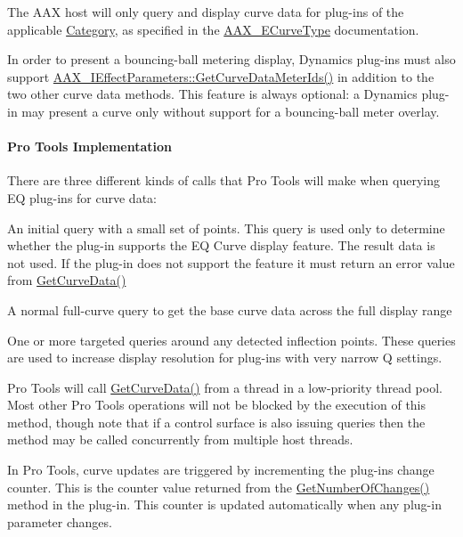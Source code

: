  The A\+A\+X host will only query and display curve data for plug-\/ins of the applicable \hyperlink{a00206_aef9637518fb1ac0e2f403444c73aba4a}{Category}, as specified in the \hyperlink{a00342_ga59c73d8f51c5c55d54a728eff39da884}{A\+A\+X\+\_\+\+E\+Curve\+Type} documentation.

 In order to present a bouncing-\/ball metering display, Dynamics plug-\/ins must also support \hyperlink{a00342_gac7ba3c1063c35d761fdeba9c9a6cc0d1}{A\+A\+X\+\_\+\+I\+Effect\+Parameters\+::\+Get\+Curve\+Data\+Meter\+Ids()} in addition to the two other curve data methods. This feature is always optional\+: a Dynamics plug-\/in may present a curve only without support for a bouncing-\/ball meter overlay.



\paragraph*{Pro Tools Implementation}

 There are three different kinds of calls that Pro Tools will make when querying E\+Q plug-\/ins for curve data\+:
\begin{DoxyItemize}
\item An initial query with a small set of points. This query is used only to determine whether the plug-\/in supports the E\+Q Curve display feature. The result data is not used. If the plug-\/in does not support the feature it must return an error value from \hyperlink{a00342_gaa85bda4027342eb644a9c92a17da6d49}{Get\+Curve\+Data()}
\item A normal full-\/curve query to get the base curve data across the full display range
\item One or more targeted queries around any detected inflection points. These queries are used to increase display resolution for plug-\/ins with very narrow Q settings.
\end{DoxyItemize}

 Pro Tools will call \hyperlink{a00342_gaa85bda4027342eb644a9c92a17da6d49}{Get\+Curve\+Data()} from a thread in a low-\/priority thread pool. Most other Pro Tools operations will not be blocked by the execution of this method, though note that if a control surface is also issuing queries then the method may be called concurrently from multiple host threads.

 In Pro Tools, curve updates are triggered by incrementing the plug-\/in\textquotesingle{}s change counter. This is the counter value returned from the \hyperlink{a00061_a17b96da201d9a242d3662e87525a7227}{Get\+Number\+Of\+Changes()} method in the plug-\/in. This counter is updated automatically when any plug-\/in parameter changes.



